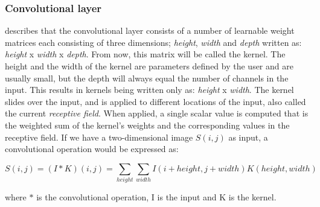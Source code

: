     \subsubsection{Convolutional layer}
     \citeauthor{o2015introduction_convolutions}\cite{o2015introduction_convolutions} describes that the convolutional layer consists of a number of learnable  weight matrices each consisting of three dimensions; \textit{height}, \textit{width} and \textit{depth} written as: \textit{height} x \textit{width} x \textit{depth}. From now, this matrix will be called the kernel. The height and the width of the kernel are parameters defined by the user and are usually small, but the depth will always equal the number of channels in the input. This results in kernels being written only as: \textit{height} x \textit{width}. The kernel slides over the input, and is applied to different locations of the input, also called the current \textit{receptive field}. When applied, a single scalar value is computed that is the weighted sum of the kernel's weights and the corresponding values in the receptive field. If we have a two-dimensional image $S(i,j)$ as input, a convolutional operation would be expressed as\cite{Goodfellow-et-al-2016_convolution}:
     
        \begin{equation}
            S(i,j) = (I*K)(i,j) = \sum_{height}\sum_{width}I(i+height,j+width)K(height,width)
        \end{equation}
     
     where $*$ is the convolutional operation, I is the input and K is the kernel.
     
